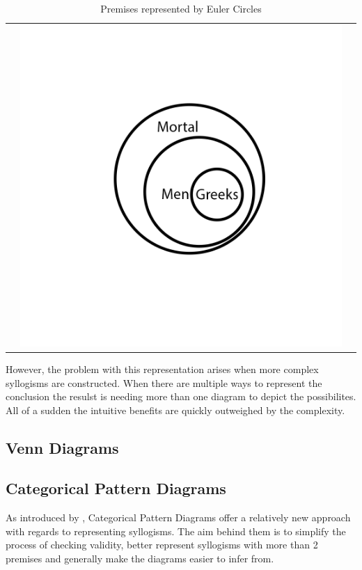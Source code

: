 \documentclass[12pt,a4paper]{report}
\begin{document}
\begin{table}[htb]
\begin{tabular}{ c  c  c }
\begin{minipage}{.29\textwidth}
    \end{minipage}
    & 
    \begin{minipage}{.29\textwidth}
      \includegraphics[scale=0.25]{EulerAllGreeksAreMortal}
    \end{minipage}
    \\
  \end{tabular}
  \caption{Premises represented by Euler Circles}\label{tbl:eulerPremises}
\end{table}
\FloatBarrier
However, the problem with this representation arises when more complex syllogisms are constructed. When there are multiple ways to represent the conclusion the resulst is needing more than one diagram to depict the possibilites. All of a sudden the intuitive benefits are quickly outweighed by the complexity.

\subsection{Venn Diagrams}

\subsection{Categorical Pattern Diagrams}
As introduced by \cite{cheng2012visualizing}, Categorical Pattern Diagrams offer a relatively new approach with regards to representing syllogisms. The aim behind them is to simplify the process of checking validity, better represent syllogisms with more than 2 premises and generally make the diagrams easier to infer from.
\end{document}
